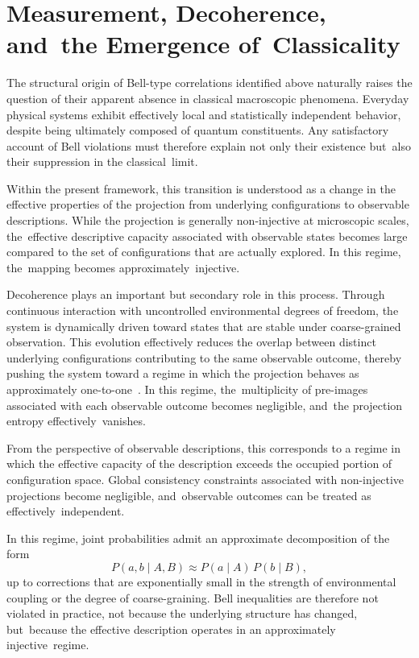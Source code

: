 \documentclass[quantumrep,article,accept,pdftex,oneauthor]{Definitions/mdpi}
\theoremstyle{remark}
\begin{document}
  \section{Measurement, Decoherence, and~the Emergence of~Classicality}
  \label{sec:classical-limit}

  The structural origin of Bell-type correlations identified above naturally raises
  the question of their apparent absence in classical macroscopic phenomena.
  Everyday physical systems exhibit effectively local and statistically independent
  behavior, despite being ultimately composed of quantum constituents.
  Any satisfactory account of Bell violations must therefore explain not only their
  existence but~also their suppression in the classical~limit.

  Within the present framework, this transition is understood as a change in the
  effective properties of the projection from underlying configurations to observable
  descriptions.
  While the projection is generally non-injective at microscopic scales, the~effective
  descriptive capacity associated with observable states becomes large compared to the
  set of configurations that are actually explored.
  In this regime, the~mapping becomes approximately~injective.

  Decoherence plays an important but secondary role in this process.
  Through continuous interaction with uncontrolled environmental degrees of freedom,
  the system is dynamically driven toward states that are stable under coarse-grained
  observation.
  This evolution effectively reduces the overlap between distinct underlying
  configurations contributing to the same observable outcome, thereby pushing the
  system toward a regime in which the projection behaves as approximately one-to-one~\cite{Zurek2003}.
  In this regime, the~multiplicity of pre-images associated with each observable outcome
  becomes negligible, and~the projection entropy effectively~vanishes.

  From the perspective of observable descriptions, this corresponds to a regime in
  which the effective capacity of the description exceeds the occupied portion of
  configuration space.
  Global consistency constraints associated with non-injective projections become
  negligible, and~observable outcomes can be treated as effectively~independent.

  In this regime, joint probabilities admit an approximate decomposition of the form
\begin{equation}
    P(a,b \mid A,B) \approx P(a \mid A)\,P(b \mid B),
  \end{equation}
  up to corrections that are exponentially small in the strength of environmental
  coupling or the degree of coarse-graining.
  Bell inequalities are therefore not violated in practice, not because the underlying
  structure has changed, but~because the effective description operates in an
  approximately injective~regime.
\end{document}
